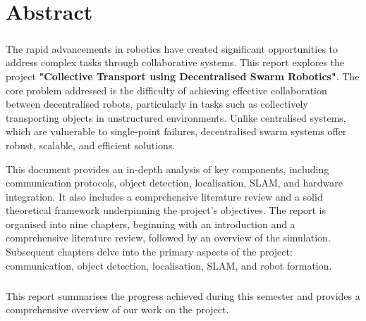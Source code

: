 \chapter*{Abstract}

\paragraph*{}The rapid advancements in robotics have created significant opportunities to address complex tasks through collaborative systems. This report explores the project \textbf{"Collective Transport using Decentralised Swarm Robotics"}. The core problem addressed is the difficulty of achieving effective collaboration between decentralised robots, particularly in tasks such as collectively transporting objects in unstructured environments. Unlike centralised systems, which are vulnerable to single-point failures, decentralised swarm systems offer robust, scalable, and efficient solutions.

This document provides an in-depth analysis of key components, including communication protocols, object detection, localisation, SLAM, and hardware integration. It also includes a comprehensive literature review and a solid theoretical framework underpinning the project’s objectives. The report is organised into nine chapters, beginning with an introduction and a comprehensive literature review, followed by an overview of the simulation. Subsequent chapters delve into the primary aspects of the project: communication, object detection, localisation, SLAM, and robot formation.

\paragraph*{}This report summarises the progress achieved during this semester and provides a comprehensive overview of our work on the project.